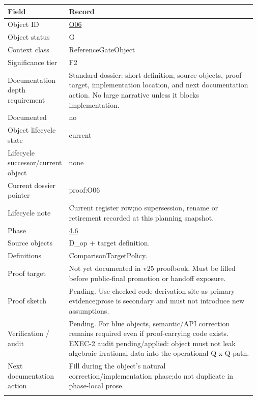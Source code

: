 \begin{longtable}{L{0.16\linewidth} L{0.81\linewidth}}
\hline
\textbf{Field} & \textbf{Record}\\
\hline
Object ID & \hyperlink{object-row-O06}{O06}\\
\hline\addlinespace[0.20em]
Object status & G\\
\hline\addlinespace[0.20em]
Context class & ReferenceGateObject\\
\hline\addlinespace[0.20em]
Significance tier & F2\\
\hline\addlinespace[0.20em]
Documentation depth requirement & Standard dossier: short definition, source objects, proof target, implementation location, and next documentation action. No large narrative unless it blocks implementation.\\
\hline\addlinespace[0.20em]
Documented & no\\
\hline\addlinespace[0.20em]
Object lifecycle state & current\\
\hline\addlinespace[0.20em]
Lifecycle successor/\allowbreak{}current object & none\\
\hline\addlinespace[0.20em]
Current dossier pointer & proof:O06\\
\hline\addlinespace[0.20em]
Lifecycle note & Current register row;\newline no supersession, rename or retirement recorded at this planning snapshot.\\
\hline\addlinespace[0.20em]
Phase & \hyperlink{phase-row-4-6}{4.6}\\
\hline\addlinespace[0.20em]
Source objects & D\_op + target definition.\\
\hline\addlinespace[0.20em]
Definitions & ComparisonTargetPolicy.\\
\hline\addlinespace[0.20em]
Proof target & Not yet documented in v25 proofbook. Must be filled before public-final promotion or handoff exposure.\\
\hline\addlinespace[0.20em]
Proof sketch & Pending. Use checked code derivation site as primary evidence;\newline prose is secondary and must not introduce new assumptions.\\
\hline\addlinespace[0.20em]
Verification /\allowbreak{} audit & Pending. For blue objects, semantic/\allowbreak{}API correction remains required even if proof-carrying code exists. EXEC-2 audit pending/\allowbreak{}applied: object must not leak algebraic irrational data into the operational Q x Q path.\\
\hline\addlinespace[0.20em]
Next documentation action & Fill during the object's natural correction/\allowbreak{}implementation phase;\newline do not duplicate in phase-local prose.\\
\hline\addlinespace[0.20em]
\end{longtable}
